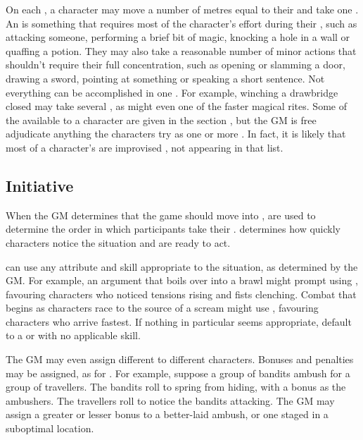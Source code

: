 On each {\turn}, a character may move a number of metres equal to their  and take one {\action}.
An {\action} is something that requires most of the character's effort during their {\turn}, such as attacking someone, performing a brief bit of magic, knocking a hole in a wall or quaffing a potion.
They may also take a reasonable number of minor actions that shouldn't require their full concentration, such as opening or slamming a door, drawing a sword, pointing at something or speaking a short sentence.
Not everything can be accomplished in one {\action}.
For example, winching a drawbridge closed may take several {\actions}, as might even one of the faster magical rites.
Some of the {\actions} available to a character are given in the section , but the GM is free adjudicate anything the characters try as one or more {\actions}.
In fact, it is likely that most of a character's {\actions} are improvised {\actions}, not appearing in that list.

\subsection{Initiative}

When the GM determines that the game should move into {\structuredtime}, {\initiative} {\tests} are used to determine the order in which participants take their {\turns}.
{\initiative} determines how quickly characters notice the situation and are ready to act.

\capital{\initiative} {\tests} can use any attribute and skill appropriate to the situation, as determined by the GM.
For example, an argument that boils over into a brawl might prompt {\initiative} {\tests} using , favouring characters who noticed tensions rising and fists clenching.
Combat that begins as characters race to the source of a scream might use , favouring characters who arrive fastest.
If nothing in particular seems appropriate, default to a  or  {\test} with no applicable skill.

The GM may even assign different {\tests} to different characters.
Bonuses and penalties may be assigned, as for {\opposedtests}.
For example, suppose a group of bandits ambush for a group of travellers.
The bandits roll  to spring from hiding, with a  bonus as the ambushers.
The travellers roll  to notice the bandits attacking.
The GM may assign a greater or lesser bonus to a better-laid ambush, or one staged in a suboptimal location.

